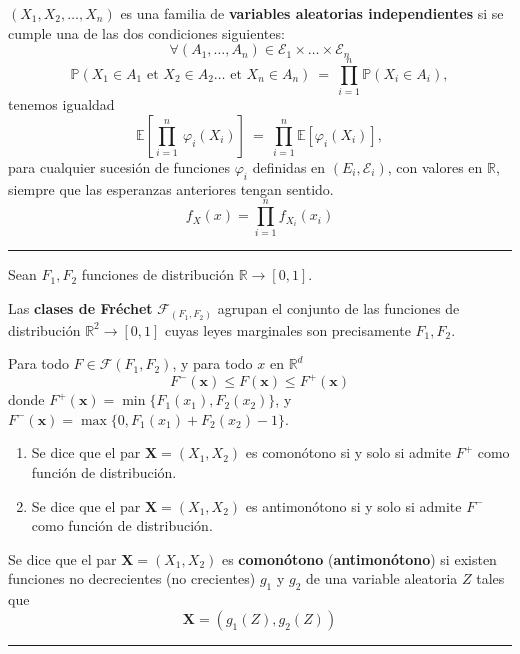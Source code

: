 	\begin{f}[Independencia]
\((X_1, X_2, \dots, X_n)\) es una familia de \textbf{variables aleatorias independientes} si se cumple una de las dos condiciones siguientes:
\[
\forall (A_1,\dots,A_n)\in\mathcal{E}_1\times\dots\times\mathcal{E}_n
\]
\[
\mathbb{P}(X_1\in A_1\text{ et }X_2\in A_2\dots\text{ et }X_n\in A_n)\ =\ \prod_{i=1}^n\mathbb{P}(X_i\in A_i),
\]
tenemos igualdad
\[
\mathbb{E}\left[\prod_{i=1}^n\ \varphi_i(X_i)\right]\ =\ \prod_{i=1}^n\mathbb{E}\left[\varphi_i(X_i)\right],
\]
para cualquier sucesión de funciones \(\varphi_i\) definidas en \((E_i,\mathcal{E}_i)\), con valores en \(\mathbb{R}\), siempre que las esperanzas anteriores tengan sentido.
\[
f_X(x)= \prod_{i=1}^{n}f_{X_i}(x_i)
\]
\end{f}
\hrule



\begin{f}
	Sean \(F_1, F_2\) funciones de distribución \(\mathbb{R}\rightarrow [0,1]\).
	
	Las \textbf{clases de Fréchet} \(\mathcal{F}_{(F_1,F_2)}\) agrupan el conjunto de las funciones de distribución \(\mathbb{R}^2\rightarrow [0,1]\)
	cuyas leyes marginales son precisamente \(F_1,F_2\).
	
	Para todo \(F \in \mathcal{F} (F_1,F_2)\), y para todo \(x\) en \(\mathbb{R}^d\)
\[
F^-(\boldsymbol{x})\leq F (\boldsymbol{x})\leq F^+(\boldsymbol{x})
\]
donde \(F^+(\boldsymbol{x}) = \min \{F_1(x_1),F_2(x_2)\}\), y 
\(F^-(\boldsymbol{x}) = \max\{0,F_1(x_1) +F_2(x_2)-1\}\).



\begin{enumerate}
	\item Se dice que el par \(\boldsymbol{X}=(X_1,X_2)\) es comonótono si y solo si admite \(F^+\) como función de distribución.
	\item Se dice que el par \(\boldsymbol{X}=(X_1,X_2)\) es antimonótono si y solo si admite \(F^-\) como función de distribución.
\end{enumerate}

Se dice que el par \(\boldsymbol{X}=(X_1,X_2)\) es \textbf{comonótono} (\textbf{antimonótono}) si existen funciones no decrecientes (no crecientes) \(g_1\) y \(g_2\) de una variable aleatoria \(Z\) tales que 
\[
\boldsymbol{X}=(g_1(Z),g_2(Z))
\]
\end{f}
\hrule

